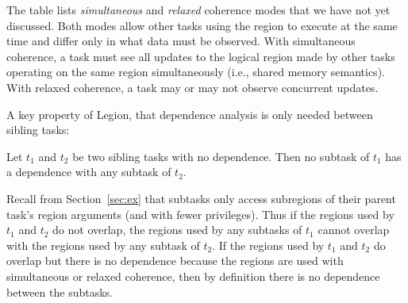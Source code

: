 The table lists {\em simultaneous} and {\em relaxed} coherence modes
that we have not yet discussed.  Both modes
allow other tasks using the region to execute at the same time and differ
only in what data must be observed.  With simultaneous coherence, a task must 
see all updates to the logical region made by other tasks operating on the same region 
simultaneously (i.e., shared memory semantics).  With relaxed coherence, 
a task may or may not observe concurrent updates.


%
%
%
%
%
%
%

A key property of Legion, that dependence analysis is only needed
between sibling tasks:
\begin{observation}
\label{obs:isolation}
\rm
Let $t_1$ and $t_2$ be two sibling tasks with no dependence.  Then no subtask of $t_1$ has a dependence with any subtask
of $t_2$.
\end{observation}
Recall from Section~\ref{sec:ex} that subtasks only access subregions of their parent task's region arguments (and with fewer
privileges).  Thus if the regions used by $t_1$ and $t_2$ do not overlap, the regions used by any subtasks of $t_1$ cannot
overlap with the regions used by any subtask of $t_2$.  If the regions used by $t_1$ and $t_2$ do overlap
but there is no dependence because the regions are used with simultaneous or relaxed coherence, then by definition there is no dependence between the subtasks.

